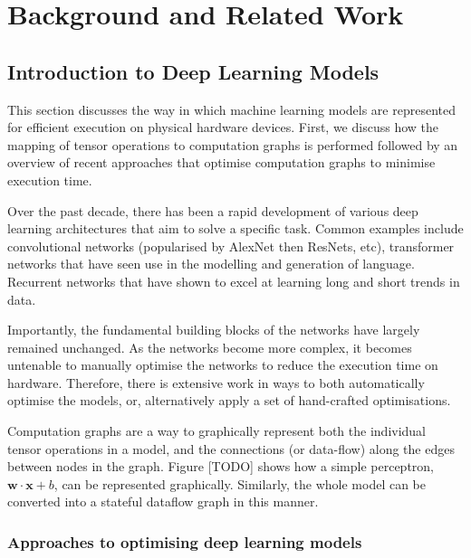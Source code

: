 \chapter{Background and Related Work}

\section{Introduction to Deep Learning Models}
This section discusses the way in which machine learning models are represented for efficient execution on physical hardware devices. First, we discuss how the mapping of tensor operations to computation graphs is performed followed by an overview of recent approaches that optimise computation graphs to minimise execution time.

Over the past decade, there has been a rapid development of various deep learning architectures that aim to solve a specific task. Common examples include convolutional networks (popularised by AlexNet then ResNets, etc), transformer networks that have seen use in the modelling and generation of language. Recurrent networks that have shown to excel at learning long and short trends in data.

Importantly, the fundamental building blocks of the networks have largely remained unchanged.  As the networks become more complex, it becomes untenable to manually optimise the networks to reduce the execution time on hardware. Therefore, there is extensive work in ways to both automatically optimise the models, or, alternatively apply a set of hand-crafted optimisations.

Computation graphs are a way to graphically represent both the individual tensor operations in a model, and the connections (or data-flow) along the edges between nodes in the graph. Figure [TODO] shows how a simple perceptron, $\mathbf{w} \cdot \mathbf{x} + b$, can be represented graphically. Similarly, the whole model can be converted into a stateful dataflow graph in this manner.


\subsection{Approaches to optimising deep learning models}


